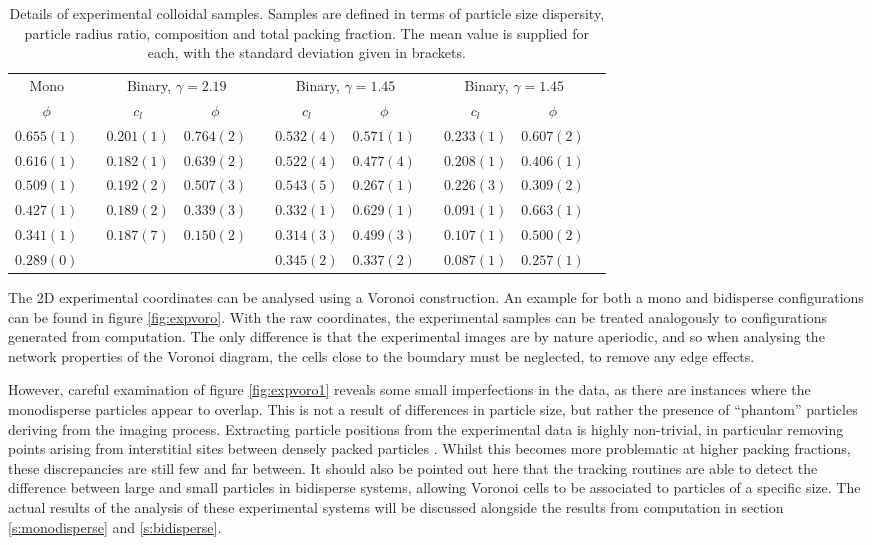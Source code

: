 \begin{table}
\centering
\caption{Details of experimental colloidal samples. Samples are defined in terms of particle size dispersity, particle radius ratio, composition and total packing fraction. The mean value is supplied for each, with the standard deviation given in brackets.}
\label{tab:expcolloid}
\begin{tabular}{@{}ccccccccccc@{}}
\toprule
\multicolumn{1}{c}{Mono} & \phantom{x} & \multicolumn{2}{c}{Binary, $\gamma=2.19$} & \phantom{x} & \multicolumn{2}{c}{Binary, $\gamma=1.45$} & \phantom{x} & \multicolumn{2}{c}{Binary, $\gamma=1.45$}\\ 
\cmidrule{1-1} \cmidrule{3-4} \cmidrule{6-7} \cmidrule{9-10}
$\phi$ & & $c_l$ & $\phi$ &  & $c_l$ & $\phi$ & & $c_l$ & $\phi$  \\ 
\midrule
$0.655(1)$&&$0.201(1)$&$0.764(2)$&&$0.532(4)$&$0.571(1)$&&$0.233(1)$&$0.607(2)$\\
$0.616(1)$&&$0.182(1)$&$0.639(2)$&&$0.522(4)$&$0.477(4)$&&$0.208(1)$&$0.406(1)$\\
$0.509(1)$&&$0.192(2)$&$0.507(3)$&&$0.543(5)$&$0.267(1)$&&$0.226(3)$&$0.309(2)$\\
$0.427(1)$&&$0.189(2)$&$0.339(3)$&&$0.332(1)$&$0.629(1)$&&$0.091(1)$&$0.663(1)$\\
$0.341(1)$&&$0.187(7)$&$0.150(2)$&&$0.314(3)$&$0.499(3)$&&$0.107(1)$&$0.500(2)$\\
$0.289(0)$&& &&&$0.345(2)$&$0.337(2)$&&$0.087(1)$&$0.257(1)$\\
\bottomrule
\end{tabular}
\end{table}

The 2D experimental coordinates can be analysed using a Voronoi construction. An example for both a mono and bidisperse configurations can be found in figure \ref{fig:expvoro}.
With the raw coordinates, the experimental samples can be treated analogously to configurations generated from computation.
The only difference is that the experimental images are by nature aperiodic, and so when analysing the network properties of the Voronoi diagram, the cells close to the boundary must be neglected, to remove any edge effects. 

However, careful examination of figure \ref{fig:expvoro1} reveals some small imperfections in the data, as there are instances where the monodisperse particles appear to overlap.
This is not a result of differences in particle size, but rather the presence of ``phantom'' particles deriving from the imaging process.
Extracting particle positions from the experimental data is highly non\--trivial, in particular removing points arising from interstitial sites between densely packed particles \cite{alice2015a}.
Whilst this becomes more problematic at higher packing fractions, these discrepancies are still few and far between.
It should also be pointed out here that the tracking routines are able to detect the difference between large and small particles in bidisperse systems, allowing Voronoi cells to be associated to particles of a specific size.
The actual results of the analysis of these experimental systems will be discussed alongside the results from computation in section \ref{s:monodisperse} and \ref{s:bidisperse}.

